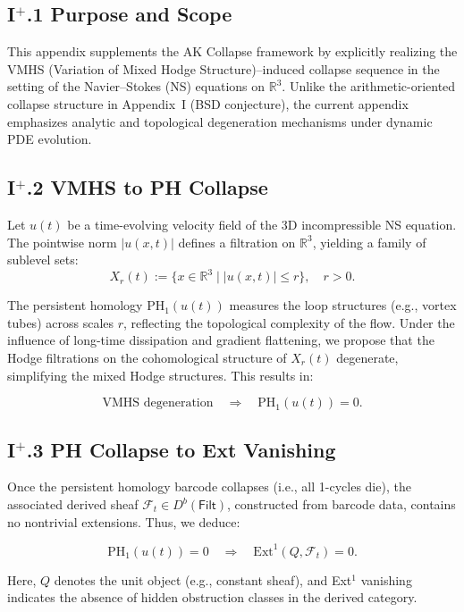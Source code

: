 \documentclass[11pt]{article}
\begin{document}
\subsection*{I$^+$.1 Purpose and Scope}

This appendix supplements the AK Collapse framework by explicitly realizing  
the VMHS (Variation of Mixed Hodge Structure)–induced collapse sequence  
in the setting of the Navier--Stokes (NS) equations on \( \mathbb{R}^3 \).  
Unlike the arithmetic-oriented collapse structure in Appendix~I (BSD conjecture),  
the current appendix emphasizes analytic and topological degeneration mechanisms  
under dynamic PDE evolution.

\subsection*{I$^+$.2 VMHS to PH Collapse}

Let \( u(t) \) be a time-evolving velocity field of the 3D incompressible NS equation.  
The pointwise norm \( |u(x,t)| \) defines a filtration on \( \mathbb{R}^3 \),  
yielding a family of sublevel sets:
\[
X_r(t) := \{ x \in \mathbb{R}^3 \mid |u(x,t)| \leq r \}, \quad r > 0.
\]

The persistent homology \( \mathrm{PH}_1(u(t)) \) measures the loop structures (e.g., vortex tubes)  
across scales \( r \), reflecting the topological complexity of the flow.  
Under the influence of long-time dissipation and gradient flattening,  
we propose that the Hodge filtrations on the cohomological structure  
of \( X_r(t) \) degenerate, simplifying the mixed Hodge structures.  
This results in:

\[
\text{VMHS degeneration} \quad \Rightarrow \quad \mathrm{PH}_1(u(t)) = 0.
\]

\subsection*{I$^+$.3 PH Collapse to Ext Vanishing}

Once the persistent homology barcode collapses (i.e., all 1-cycles die),  
the associated derived sheaf \( \mathcal{F}_t \in D^b(\mathsf{Filt}) \),  
constructed from barcode data, contains no nontrivial extensions.  
Thus, we deduce:

\[
\mathrm{PH}_1(u(t)) = 0 \quad \Rightarrow \quad \mathrm{Ext}^1(Q, \mathcal{F}_t) = 0.
\]

Here, \( Q \) denotes the unit object (e.g., constant sheaf), and Ext$^1$ vanishing indicates  
the absence of hidden obstruction classes in the derived category.
\end{document}

